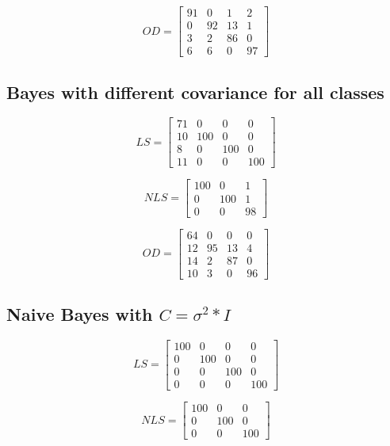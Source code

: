 \documentclass[11pt,a4paper]{article}
\begin{document}
$$
OD = 
\begin{bmatrix}

 	91 &    0 &    1 &    2 \\
     0 &   92 &   13 &    1 \\
     3 &    2 &   86 &    0 \\
     6 &    6 &    0 &   97

\end{bmatrix}
$$
\subsection{Bayes with different covariance for all classes}
$$LS = 
\begin{bmatrix}
71   &  0 &    0 &    0 \\
10  & 100   &  0   &  0 \\
8   &  0 &  100  &   0 \\
11   &  0 &    0 &  100
\end{bmatrix}
$$

$$
NLS = \begin{bmatrix}
100  &   0 &  1  \\
0 &  100  &  1 \\
0   &  0   & 98  
\end{bmatrix}
$$


$$ OD = 
\begin{bmatrix}
	64 &    0 &    0 &    0 \\
    12 &   95 &   13 &    4 \\
    14 &    2 &   87 &    0 \\ 
    10 &    3 &    0 &   96 
\end{bmatrix}   
$$
\subsection{Naive Bayes with $C=\sigma^2*I$}
$$LS = \begin{bmatrix}
100   &  0 &    0 &    0 \\
0  & 100   &  0   &  0 \\
0   &  0 &  100  &   0 \\
0   &  0 &    0 &  100
\end{bmatrix}
$$

$$
NLS = \begin{bmatrix}
100  &   0 &   0  \\
0 &  100  &  0  \\
0   &  0   & 100  
\end{bmatrix}
$$
\end{document}
